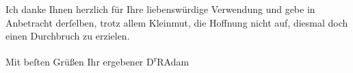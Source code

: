\pstart
           Ich danke Ihnen herzlich für Ihre liebenswürdige Verwendung und gebe in Anbetracht
               derſelben, trotz allem Kleinmut, die Hoffnung nicht auf, diesmal doch einen
               Durchbruch zu erzielen.\pend
           
\pstart
           Mit beſten Grüßen Ihr ergebener\pend
           \pstart \spacefill\mbox{D\textsuperscript{r}RAdam}\pend{}\endnumbering{}  
      